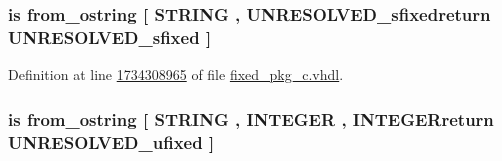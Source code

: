 \hypertarget{classfixed__pkg_a2b916b59ea97f4c9f2ede4a0fec2c7fc}{}
\subsubsection[{from\+\_\+octal\+\_\+string}]{ {\bfseries \textcolor{keywordflow}{is}\textcolor{vhdlchar}{ }\textcolor{vhdlchar}{from\+\_\+ostring}\textcolor{vhdlchar}{ }\textcolor{vhdlchar}{\mbox{[}}\textcolor{vhdlchar}{ }\textcolor{comment}{S\+T\+R\+I\+N\+G}\textcolor{vhdlchar}{ }\textcolor{vhdlchar}{,}\textcolor{vhdlchar}{ }\textcolor{vhdlchar}{U\+N\+R\+E\+S\+O\+L\+V\+E\+D\+\_\+sfixedreturn}\textcolor{vhdlchar}{ }{\bfseries {\bf U\+N\+R\+E\+S\+O\+L\+V\+E\+D\+\_\+sfixed}} \textcolor{vhdlchar}{ }\textcolor{vhdlchar}{\mbox{]}}\textcolor{vhdlchar}{ }} \hspace{0.3cm}{\ttfamily [Alias]}}\label{classfixed__pkg_a2b916b59ea97f4c9f2ede4a0fec2c7fc}


Definition at line \hyperlink{fixed__pkg__c_8vhdl_source_l1734308965}{1734308965} of file \hyperlink{fixed__pkg__c_8vhdl_source}{fixed\+\_\+pkg\+\_\+c.\+vhdl}.

\hypertarget{classfixed__pkg_a25762bc17512150ae47c87f56611c70b}{}
\subsubsection[{from\+\_\+octal\+\_\+string}]{ {\bfseries \textcolor{keywordflow}{is}\textcolor{vhdlchar}{ }\textcolor{vhdlchar}{from\+\_\+ostring}\textcolor{vhdlchar}{ }\textcolor{vhdlchar}{\mbox{[}}\textcolor{vhdlchar}{ }\textcolor{comment}{S\+T\+R\+I\+N\+G}\textcolor{vhdlchar}{ }\textcolor{vhdlchar}{,}\textcolor{vhdlchar}{ }\textcolor{comment}{I\+N\+T\+E\+G\+E\+R}\textcolor{vhdlchar}{ }\textcolor{vhdlchar}{,}\textcolor{vhdlchar}{ }\textcolor{vhdlchar}{I\+N\+T\+E\+G\+E\+Rreturn}\textcolor{vhdlchar}{ }{\bfseries {\bf U\+N\+R\+E\+S\+O\+L\+V\+E\+D\+\_\+ufixed}} \textcolor{vhdlchar}{ }\textcolor{vhdlchar}{\mbox{]}}\textcolor{vhdlchar}{ }} \hspace{0.3cm}{\ttfamily [Alias]}}\label{classfixed__pkg_a25762bc17512150ae47c87f56611c70b}


